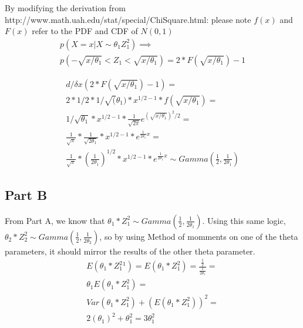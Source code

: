 \documentclass{article}\usepackage[]{graphicx}\usepackage[]{color}
\begin{document}
By modifying the derivation from http://www.math.uah.edu/stat/special/ChiSquare.html:
please note $f(x)$ and $F(x)$ refer to the PDF and CDF of $N(0,1)$
\begin{equation}
\begin{split}
p(X=x | X\sim \theta_{1} Z_{1}^{2}) \implies \\
p(-\sqrt{x/\theta_1}<Z_1<\sqrt{x/\theta_1}) = 2*F(\sqrt{x/\theta_{1}}) - 1
\end{split}
\end{equation}

\begin{equation}
\begin{split}
d/\delta x(2*F(\sqrt{x/\theta_{1}})-1)= \\
2*1/2*1/\sqrt{(}\theta_{1})*x^{1/2-1}*f(\sqrt{x/\theta_{1}})=\\
1/\sqrt{\theta_{1}}*x^{1/2-1}*\frac{1}{\sqrt{2\pi}}e^{(\sqrt{x/\theta_{1}})^{2}/2}=\\
\frac{1}{\sqrt{\pi}}*\frac{1}{\sqrt{2\theta_{1}}}*x^{1/2-1}*e^{\frac{1}{2\theta_{1}}x} =\\
\frac{1}{\sqrt{\pi}}*(\frac{1}{2\theta_{1}})^{1/2}*x^{1/2-1}*e^{\frac{1}{2\theta_{1}}x} \sim Gamma(\frac{1}{2},\frac{1}{2\theta_{1}})
\end{split}
\end{equation}
\subsection*{Part B}
From Part A, we know that $\theta_{1}*Z_{1}^{2} \sim Gamma(\frac{1}{2},\frac{1}{2\theta_{1}})$. Using this same logic, $\theta_{2}*Z_{2}^{2} \sim Gamma(\frac{1}{2},\frac{1}{2\theta_{2}})$, so by using Method of momments on one of the theta parameters, it should mirror the results of the other theta parameter.
\begin{equation}
\begin{split}
E(\theta_{1}*Z_{1}^{2}{}^{1})=E(\theta_{1}*Z_{1}^{2})=\frac{\frac{1}{2}}{\frac{1}{2\theta_{1}}}=\\
\theta_{1}E
(\theta_{1}*Z_{1}^{2})= \\
Var(\theta_{1}*Z_{1}^{2})+(E(\theta_{1}*Z_{1}^{2}))^{2}=\\
2(\theta_{1})^{2}+\theta_{1}^{2}=3\theta_{1}^{2}
\end{split}
\end{equation}
\end{document}
